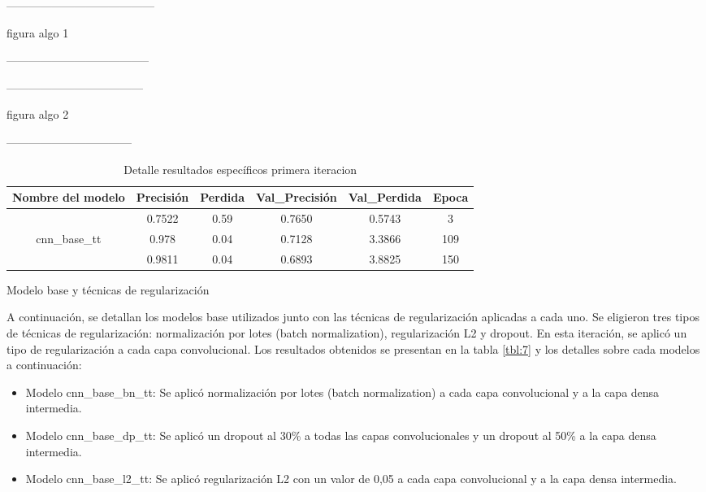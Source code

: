 ---------------------------------------

figura algo 1

--------------------------------------

------------------------------------

figura algo 2

---------------------------------

\begin{table}[!ht]
	\centering
	\begin{tabular}{|c|c|c|c|c|c|}
		\hline
		\textbf{Nombre del modelo} & \textbf{Precisión} & \textbf{Perdida} & \textbf{Val\_Precisión} & \textbf{Val\_Perdida} & \textbf{Epoca} \\ \hline
		~ & 0.7522 & 0.59 & 0.7650 & 0.5743 & 3 \\ \cline{2-6} 
		cnn\_base\_tt & 0.978 & 0.04 & 0.7128 & 3.3866 & 109 \\ \cline{2-6} 
		~ & 0.9811 & 0.04 & 0.6893 & 3.8825 & 150 \\ \hline
	\end{tabular}
	\caption{Detalle resultados específicos primera iteracion}
	\label{tbl:6}
\end{table}

Modelo base y técnicas de regularización

A continuación, se detallan los modelos base utilizados junto con las técnicas de regularización aplicadas a cada uno. Se eligieron tres tipos de técnicas de regularización: normalización por lotes (batch normalization), regularización L2 y dropout. En esta iteración, se aplicó un tipo de regularización a cada capa convolucional. Los resultados obtenidos se presentan en la tabla \ref{tbl:7} y los detalles  sobre cada modelos a continuación:

\begin{itemize}
\item Modelo cnn\_base\_bn\_tt: Se aplicó normalización por lotes (batch normalization) a cada capa convolucional y a la capa densa intermedia.
\item Modelo cnn\_base\_dp\_tt: Se aplicó un dropout al 30\% a todas las capas convolucionales y un dropout al 50\% a la capa densa intermedia.
\item Modelo cnn\_base\_l2\_tt: Se aplicó regularización L2 con un valor de 0,05 a cada capa convolucional y a la capa densa intermedia.
\end{itemize}

